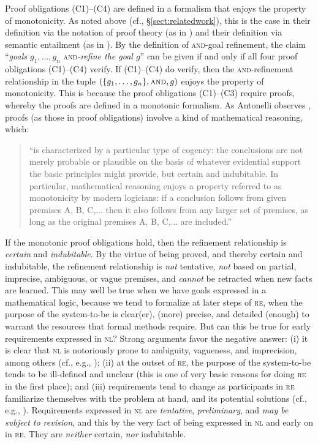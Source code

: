 \documentclass[10pt, conference, compsocconf]{IEEEtran}
\begin{document}
Proof obligations (C1)--(C4) are defined in a formalism that enjoys the property of monotonicity. As noted above (cf., \S\ref{sect:relatedwork}), this is the case in their definition via the notation of proof theory (as in \cite{Darimont+:1996:FSE}) and their definition via semantic entailment (as in \cite{Letier:2001:PHD}). By the definition of \textsc{and}-goal refinement, the claim ``\textit{goals $g_{1}, \ldots, g_{n}$} \textsc{and}\textit{-refine the goal $g$}'' can be given if and only if all four proof obligations (C1)--(C4) verify. If (C1)--(C4) do verify, then the \textsc{and}-refinement relationship in the tuple $(\{ g_{1}, \ldots, g_{n} \}, \textsc{and}, g)$ enjoys the property of monotonicity. This is because the proof obligations (C1)--(C3) require proofs, whereby the proofs are defined in a monotonic formalism. As Antonelli observes \cite{Antonelli:2008:SEP}, proofs (as those in proof obligations) involve a kind of mathematical reasoning, which:

\begin{quote}
 ``is characterized by a particular type of cogency: the conclusions are not merely probable or plausible on the basis of whatever evidential support the basic principles might provide, but certain and indubitable. In particular, mathematical reasoning enjoys a property referred to as monotonicity by modern logicians: if a conclusion follows from given premises A, B, C,... then it also follows from any larger set of premises, as long as the original premises A, B, C,... are included.''
\end{quote}

If the monotonic proof obligations hold, then the refinement relationship is \textit{certain} and \textit{indubitable}. By the virtue of being proved, and thereby certain and indubitable, the refinement relationship is \textit{not} tentative, \textit{not} based on partial, imprecise, ambiguous, or vague premises, and \textit{cannot} be retracted when new facts are learned. This may well be true when we have goals expressed in a mathematical logic, because we tend to formalize at later steps of \textsc{re}, when the purpose of the system-to-be is clear(er), (more) precise, and detailed (enough) to warrant the resources that formal methods require. But can this be true for early requirements expressed in \textsc{nl}? Strong arguments favor the negative answer: (i) it is clear that \textsc{nl} is notoriously prone to ambiguity, vagueness, and imprecision, among others (cf., e.g., \cite{Sorensen:2008}); (ii) at the outset of \textsc{re}, the purpose of the system-to-be tends to be ill-defined and unclear (this is one of very basic reasons for doing \textsc{re} in the first place); and (iii) requirements tend to change as participants in \textsc{re} familiarize themselves with the problem at hand, and its potential solutions (cf., e.g., \cite{Goguen+:1993:RE}). Requirements expressed in \textsc{nl} are \textit{tentative}, \textit{preliminary}, and \textit{may be subject to revision}, and this by the very fact of being expressed in \textsc{nl} and early on in \textsc{re}. They are \textit{neither} certain, \textit{nor} indubitable. 
\end{document}
